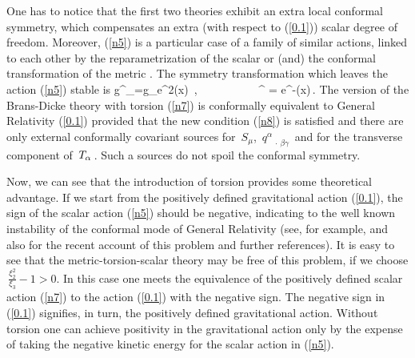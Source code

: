  One has to notice that the first two theories exhibit 
 an extra local
 conformal symmetry, which compensates an extra (with respect to
 (\ref{0.1})) scalar degree of freedom. Moreover, (\ref{n5}) is a
 particular case of a family of
 similar actions, linked to each other
 by the reparametrization of the scalar or (and) the conformal
 transformation of the metric \cite{conf}. The symmetry
 transformation which leaves the action (\ref{n5}) stable is
 \beq
 g^{\prime}_{\mu\nu}=g_{\mu\nu}\cdot e^{2\rho(x)}
 \,,\, \, \, \, \, \, \, \, \, \, \,
 \ph^{\prime} = \ph \cdot e^{-\rho(x)}\,.
 \label{nnn}
 \eeq
 The version of the
 Brans-Dicke theory with torsion (\ref{n7})
 is conformally equivalent to General Relativity (\ref{0.1}) 
 provided
 that the new condition (\ref{n8}) is satisfied and there are only
 external conformally covariant sources for
 $\,S_\mu$, $\,{q^{\alpha}}_{\,\cdot\,\beta\gamma}\,$
 and for the transverse component of $\,T_{\alpha}\,$. Such a sources
 do not spoil the conformal symmetry.

 Now, we can see that 
 the introduction of torsion provides some theoretical advantage.
 If we start from the positively defined gravitational action
 (\ref{0.1}), the sign of the scalar action (\ref{n5}) should
 be negative, indicating to the well known instability of the
 conformal mode of General Relativity (see, for example, 
 \cite{hawking-foam} and also \cite{wet,mod}
 for the recent account of this problem and further references).
 It is easy to see that the metric-torsion-scalar theory may be
 free of this problem, if we choose
 $\,\frac{\xi^2_2}{\xi_3}-1 > 0$. In this case one meets 
 the equivalence of the
 positively defined scalar action (\ref{n7}) to the
 action (\ref{0.1}) with the negative sign. The negative
 sign in (\ref{0.1}) signifies, in turn, the positively defined
 gravitational action. Without torsion one can achieve positivity
 in the gravitational action only by the expense of taking the 
 negative kinetic energy for the scalar action in (\ref{n5}).

